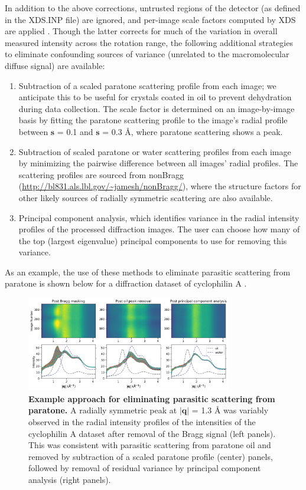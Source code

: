 \documentclass{article}
\begin{document}
In addition to the above corrections, untrusted regions of the detector (as defined in the XDS.INP file) are ignored, and per-image scale factors computed by XDS are applied \cite{pmid20124693}. Though the latter corrects for much of the variation in overall measured intensity across the rotation range, the following additional strategies to eliminate confounding sources of variance (unrelated to the macromolecular diffuse signal) are available:
\begin{enumerate}
%
\item Subtraction of a scaled paratone scattering profile from each image; we anticipate this to be useful for crystals coated in oil to prevent dehydration during data collection. The scale factor is determined on an image-by-image basis by fitting the paratone scattering profile to the image's radial profile between $\mathbf{s}$ = 0.1 and $\mathbf{s}$ = 0.3 \AA{}, where paratone scattering shows a peak.
%
\item Subtraction of scaled paratone or water scattering profiles from each image by minimizing the pairwise difference between all images' radial profiles. The scattering profiles are sourced from nonBragg (\url{http://bl831.als.lbl.gov/~jamesh/nonBragg/}), where the structure factors for other likely sources of radially symmetric scattering are also available.
%
\item Principal component analysis, which identifies variance in the radial intensity profiles of the processed diffraction images. The user can choose how many of the top (largest eigenvalue) principal components to use for removing this variance.
%
\end{enumerate}
%

As an example, the use of these methods to eliminate parasitic scattering from paratone is shown below for a diffraction dataset of cyclophilin A \cite{sbdb68}.

\begin{figure}[htb!]
\centering
\includegraphics[width=0.8\textwidth]{figures/parasitic.png}
\caption{\textbf{Example approach for eliminating parasitic scattering from paratone.} A radially symmetric peak at $ \vert \mathbf{q} \vert $ = 1.3 \AA{} was variably observed in the radial intensity profiles of the intensities of the cyclophilin A dataset after removal of the Bragg signal (left panels). This was consistent with parasitic scattering from paratone oil and removed by subtraction of a scaled paratone profile (center) panels, followed by removal of residual variance by principal component analysis (right panels). }\label{parasitic}
\end{figure}
\end{document}
